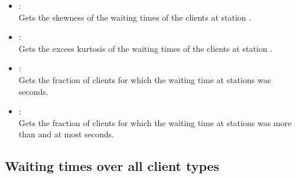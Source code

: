 \begin{itemize}
\item
{}:\\
Gets the skewness of the waiting times of the clients at station . 

\item
{}:\\
Gets the excess kurtosis of the waiting times of the clients at station . 

\item
{}:\\
Gets the fraction of clients for which the waiting time at stations  was  seconds.

\item
{}:\\
Gets the fraction of clients for which the waiting time at stations  was more than  and at most  seconds.

\end{itemize}



\subsection{Waiting times over all client types}
  
